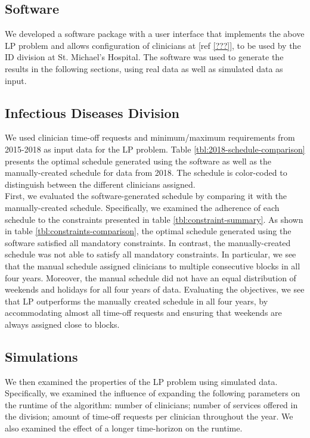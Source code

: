 \subsection{Software}
We developed a software package with a user interface that implements the above LP problem and allows configuration of clinicians at [ref \ref{???}], to be used by the ID division at St. Michael's Hospital. The software was used to generate the results in the following sections, using real data as well as simulated data as input.

\subsection{Infectious Diseases Division}  %
We used clinician time-off requests and minimum/maximum requirements from 2015-2018 as input data for the LP problem. Table \ref{tbl:2018-schedule-comparison} presents the optimal schedule generated using the software as well as the manually-created schedule for data from 2018. The schedule is color-coded to distinguish between the different clinicians assigned. \\



First, we evaluated the software-generated schedule by comparing it with the manually-created schedule. Specifically, we examined the adherence of each schedule to the constraints presented in table \ref{tbl:constraint-summary}. As shown in table \ref{tbl:constraints-comparison}, the optimal schedule generated using the software satisfied all mandatory constraints. In contrast, the manually-created schedule was not able to satisfy all mandatory constraints. In particular, we see that the manual schedule assigned clinicians to multiple consecutive blocks in all four years. Moreover, the manual schedule did not have an equal distribution of weekends and holidays for all four years of data. Evaluating the objectives, we see that LP outperforms the manually created schedule in all four years, by accommodating almost all time-off requests and ensuring that weekends are always assigned close to blocks.



\subsection{Simulations}
We then examined the properties of the LP problem using simulated data. Specifically, we examined the influence of expanding the following parameters on the runtime of the algorithm: number of clinicians; number of services offered in the division; amount of time-off requests per clinician throughout the year. We also examined the effect of a longer time-horizon on the runtime. \\

